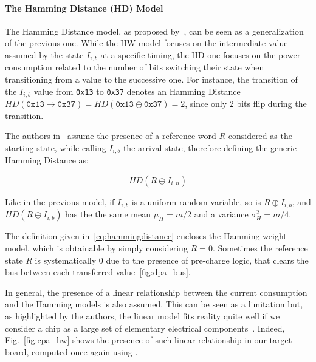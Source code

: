             \paragraph{The Hamming Distance (HD) Model}
                The Hamming Distance model, as proposed by~\cite{brier2004correlation}, can be seen as a generalization of the previous one. While the HW model focuses on the intermediate value assumed by the state $I_{i,b}$ at a specific timing, the HD one focuses on the power consumption related to the number of bits switching their state when transitioning from a value to the successive one. For instance, the transition of the $I_{i,b}$ value from \texttt{0x13} to \texttt{0x37} denotes an Hamming Distance $HD(\texttt{0x13} \rightarrow \texttt{0x37}) = HD(\texttt{0x13} \oplus \texttt{0x37}) = 2$, since only 2 bits flip during the transition.
                
                The authors in~\cite{brier2004correlation} assume the presence of a reference word $R$ considered as the starting state, while calling $I_{i,b}$ the arrival state, therefore defining the generic Hamming Distance as:

                \begin{equation}\label{eq:hammingdistance}
                    HD(R \oplus I_{i,n})
                \end{equation}
                
                Like in the previous model, if $I_{i,b}$ is a uniform random variable, so is $R \oplus I_{i,b}$, and $HD(R \oplus I_{i,b})$ has the the same mean $\mu_H = m/2$ and a variance $\sigma^2_H = m/4$.

                The definition given in~\ref{eq:hammingdistance} encloses the Hamming weight model, which is obtainable by simply considering $R = 0$. Sometimes the reference state $R$ is systematically 0 due to the presence of pre-charge logic, that clears the bus between each transferred value~\ref{fig:dpa_bus}.

                In general, the presence of a linear relationship between the current consumption and the Hamming models is also assumed. This can be seen as a limitation but, as highlighted by the authors, the linear model fits reality quite well if we consider a chip as a large set of elementary electrical components~\cite{brier2004correlation}. Indeed, Fig.~\ref{fig:cpa_hw} shows the presence of such linear relationship in our \xmega{} target board, computed once again using \cw{}.

